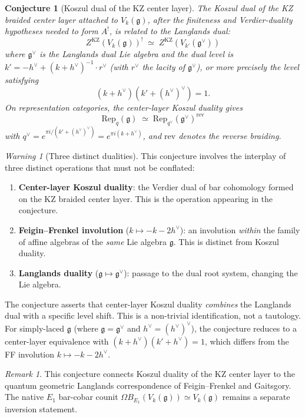 \documentclass[11pt]{article}
\newtheorem{conjecture}[theorem]{Conjecture}
\theoremstyle{definition}
\theoremstyle{remark}
\newtheorem{remark}[theorem]{Remark}
\newtheorem{warning}[theorem]{Warning}
\newcommand{\Rep}{\mathrm{Rep}}
\newcommand{\frakg}{\mathfrak{g}}
\newcommand{\KZ}{\mathrm{KZ}}
\newcommand{\hv}{h^\vee}
\begin{document}
\begin{conjecture}[Koszul dual of the KZ center layer]
\label{conj:koszul-dual-vk}
The Koszul dual of the KZ braided center layer attached to
$V_k(\frakg)$, after the finiteness and Verdier-duality hypotheses
needed to form $A^!$, is related to the Langlands dual:
\[
 Z^{\KZ}(V_k(\frakg))^! \;\simeq\; Z^{\KZ}(V_{k'}(\frakg^\vee))
\]
where $\frakg^\vee$ is the Langlands dual Lie algebra and the dual level
is $k' = -\hv + (k + \hv)^{-1} \cdot r^\vee$ (with $r^\vee$ the lacity
of $\frakg^\vee$), or more precisely the level satisfying
\[
 (k + \hv)(k' + (\hv)^\vee) = 1.
\]
On representation categories, the center-layer Koszul duality gives
\[
 \Rep_q(\frakg) \;\simeq\; \Rep_{q^\vee}(\frakg^\vee)^{\mathrm{rev}}
\]
with $q^\vee = e^{\pi i/(k' + (\hv)^\vee)} = e^{\pi i (k + \hv)}$,
and $\mathrm{rev}$ denotes the reverse braiding.
\end{conjecture}

\begin{warning}[Three distinct dualities]
\label{warn:three-dualities}
This conjecture involves the interplay of three distinct operations that must not be conflated:
\begin{enumerate}[label=(\arabic*)]
 \item \textbf{Center-layer Koszul duality}: the Verdier dual of bar
 cohomology formed on the KZ braided center layer. This is the
 operation appearing in the conjecture.
 \item \textbf{Feigin--Frenkel involution} ($k \mapsto -k - 2\hv$): an involution \emph{within} the family of affine algebras of the \emph{same} Lie algebra $\frakg$. This is distinct from Koszul duality.
 \item \textbf{Langlands duality} ($\frakg \mapsto \frakg^\vee$): passage to the dual root system, changing the Lie algebra.
\end{enumerate}
The conjecture asserts that center-layer Koszul duality \emph{combines}
the Langlands dual with a specific level shift. This is a non-trivial
identification, not a tautology. For simply-laced $\frakg$ (where
$\frakg = \frakg^\vee$ and $\hv = (\hv)^\vee$), the conjecture reduces
to a center-layer equivalence with $(k+\hv)(k'+\hv) = 1$, which differs
from the FF involution $k \mapsto -k - 2\hv$.
\end{warning}

\begin{remark}
This conjecture connects Koszul duality of the KZ center layer to the
quantum geometric Langlands correspondence of Feigin--Frenkel and
Gaitsgory. The native $E_1$ bar-cobar counit
$\Omega B_{E_1}(V_k(\frakg))\simeq V_k(\frakg)$ remains a separate
inversion statement.
\end{remark}
\end{document}
